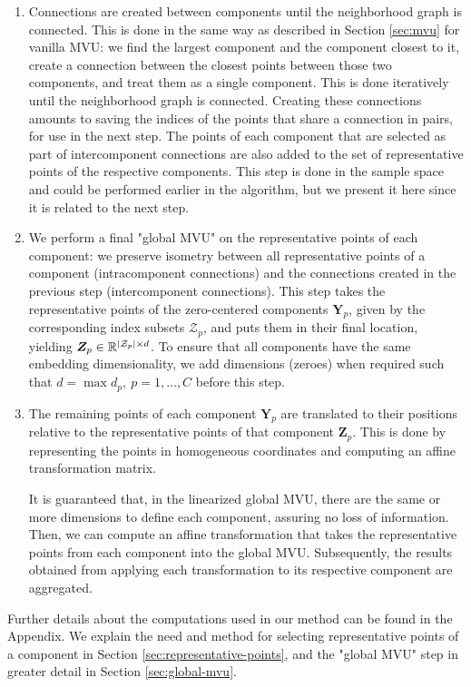 \documentclass{article} %
\begin{document}
\begin{enumerate}
    \item Connections are created between components until the neighborhood graph is connected. This is done in the same way as described in Section \ref{sec:mvu} for vanilla MVU: we find the largest component and the component closest to it, create a connection between the closest points between those two components, and treat them as a single component. This is done iteratively until the neighborhood graph is connected. Creating these connections amounts to saving the indices of the points that share a connection in pairs, for use in the next step. The points of each component that are selected as part of intercomponent connections are also added to the set of representative points of the respective components. This step is done in the sample space and could be performed earlier in the algorithm, but we present it here since it is related to the next step.
    \item We perform a final "global MVU" on the representative points of each component: we preserve isometry between all representative points of a component (intracomponent connections) and the connections created in the previous step (intercomponent connections). This step takes the representative points of the zero-centered components $\bm{Y}_p$, given by the corresponding index subsets $\mathcal{Z}_p$, and puts them in their final location, yielding $\bm{Z}_p\in\mathbb{R}^{|\mathcal{Z}_p|\times d}$. To ensure that all components have the same embedding dimensionality, we add dimensions (zeroes) when required such that $d=\max d_p,\ p=1,\dotsc,C$ before this step.
    \item The remaining points of each component $\bm{Y}_p$ are translated to their positions relative to the representative points of that component $\bm{Z}_p$. This is done by representing the points in homogeneous coordinates and computing an affine transformation matrix.

    It is guaranteed that, in the linearized global MVU, there are the same or more dimensions to define each component, assuring no loss of information. Then, we can compute an affine transformation that takes the representative points from each component into the global MVU. Subsequently, the results obtained from applying each transformation to its respective component are aggregated.


\end{enumerate}

Further details about the computations used in our method can be found in the Appendix. We explain the need and method for selecting representative points of a component in Section \ref{sec:representative-points}, and the "global MVU" step in greater detail in Section \ref{sec:global-mvu}.
\end{document}
